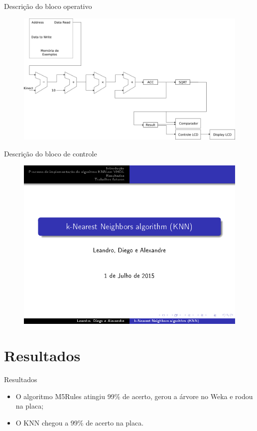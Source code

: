 \documentclass[11pt]{beamer}
\begin{document}
\begin{frame}{Descrição do bloco operativo}
	\begin{figure}[ht]
	\centering
	\includegraphics[width=1.0\textwidth]{knn_sem_controle}
	\label{fig:knn_sem_controle}
	\end{figure}
\end{frame}

\begin{frame}{Descrição do bloco de controle}
	\begin{figure}[ht]
	\centering
	\includegraphics[width=1.0\textwidth]{knn}
	\label{fig:knncalc}
	\end{figure}
\end{frame}

\section{Resultados}
\begin{frame}{Resultados}

\begin{itemize}
	\item O algoritmo M5Rules atingiu 99\% de acerto, gerou a árvore no
	Weka e rodou na placa;
	\item O KNN chegou a 99\% de acerto na placa.
\end{itemize}

\end{frame}
\end{document}
